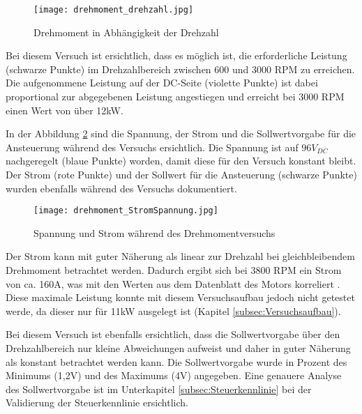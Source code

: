 \begin{figure}[H]
	\centering
	\texttt{[image: drehmoment\_drehzahl.jpg]}
	\caption{Drehmoment in Abhängigkeit der Drehzahl}\label{fig:drehmoment/drehzahl}
\end{figure}

Bei diesem Versuch ist ersichtlich, dass es möglich ist, die erforderliche Leistung (schwarze Punkte) im Drehzahlbereich zwischen 600 und 3000 RPM zu erreichen. Die aufgenommene Leistung auf der DC-Seite (violette Punkte) ist dabei proportional zur abgegebenen Leistung angestiegen und erreicht bei 3000 RPM einen Wert von über 12kW.

\newpage

In der Abbildung \ref{fig:drehmoment/StromSpannung} sind die Spannung, der Strom und die Sollwertvorgabe für die Ansteuerung während des Versuchs ersichtlich. Die Spannung ist auf $96V_{DC}$ nachgeregelt (blaue Punkte) worden, damit diese für den Versuch konstant bleibt. Der Strom (rote Punkte) und der Sollwert für die Ansteuerung (schwarze Punkte) wurden ebenfalls während des Versuchs dokumentiert.


\begin{figure}[H]
	\centering
	\texttt{[image: drehmoment\_StromSpannung.jpg]}
	\caption{Spannung und Strom während des Drehmomentversuchs}\label{fig:drehmoment/StromSpannung}
\end{figure}

Der Strom kann mit guter Näherung als linear zur Drehzahl bei gleichbleibendem Drehmoment betrachtet werden. Dadurch ergibt sich bei 3800 RPM ein Strom von ca. 160A, was mit den Werten aus dem Datenblatt des Motors korreliert \cite{MotorData}. Diese maximale Leistung konnte mit diesem Versuchsaufbau jedoch nicht getestet werde, da dieser nur für 11kW ausgelegt ist (Kapitel \ref{subsec:Versuchsaufbau}).

Bei diesem Versuch ist ebenfalls ersichtlich, dass die Sollwertvorgabe über den Drehzahlbereich nur kleine Abweichungen aufweist und daher in guter Näherung als konstant betrachtet werden kann. Die Sollwertvorgabe wurde in Prozent des Minimums (1,2V) und des Maximums (4V) angegeben. Eine genauere Analyse des Sollwertvorgabe ist im Unterkapitel \ref{subsec:Steuerkennlinie} bei der Validierung der Steuerkennlinie ersichtlich.
